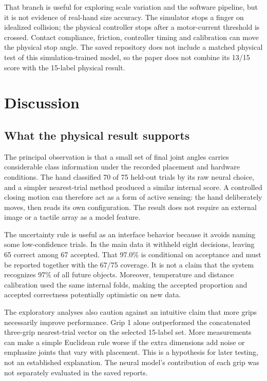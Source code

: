 \documentclass[12pt,a4paper]{article}
\begin{document}
That branch is useful for exploring scale variation and the software pipeline, but it is not evidence of real-hand size accuracy. The simulator stops a finger on idealized collision; the physical controller stops after a motor-current threshold is crossed. Contact compliance, friction, controller timing and calibration can move the physical stop angle. The saved repository does not include a matched physical test of this simulation-trained model, so the paper does not combine its 13/15 score with the 15-label physical result.

\section{Discussion}

\subsection{What the physical result supports}

The principal observation is that a small set of final joint angles carries considerable class information under the recorded placement and hardware conditions. The hand classified 70 of 75 held-out trials by its raw neural choice, and a simpler nearest-trial method produced a similar internal score. A controlled closing motion can therefore act as a form of active sensing: the hand deliberately moves, then reads its own configuration. The result does not require an external image or a tactile array as a model feature.

The uncertainty rule is useful as an interface behavior because it avoids naming some low-confidence trials. In the main data it withheld eight decisions, leaving 65 correct among 67 accepted. That 97.0\% is conditional on acceptance and must be reported together with the 67/75 coverage. It is not a claim that the system recognizes 97\% of all future objects. Moreover, temperature and distance calibration used the same internal folds, making the accepted proportion and accepted correctness potentially optimistic on new data.

The exploratory analyses also caution against an intuitive claim that more grips necessarily improve performance. Grip 1 alone outperformed the concatenated three-grip nearest-trial vector on the selected 15-label set. More measurements can make a simple Euclidean rule worse if the extra dimensions add noise or emphasize joints that vary with placement. This is a hypothesis for later testing, not an established explanation. The neural model's contribution of each grip was not separately evaluated in the saved reports.
\end{document}
